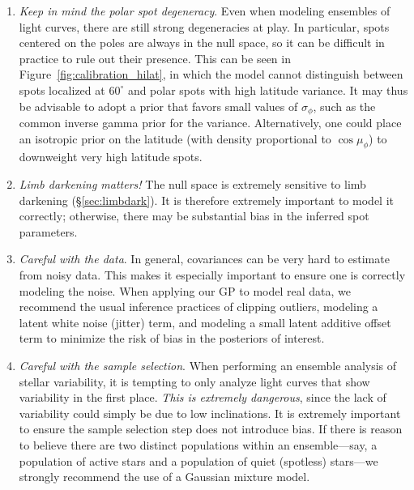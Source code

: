 \documentclass[modern]{aastex62}
\begin{document}
\begin{enumerate}
    \item \emph{Keep in mind the polar spot degeneracy}. Even when modeling
          ensembles of light curves, there are still strong degeneracies at
          play. In particular, spots centered on the poles are always in
          the null space, so it can be difficult in practice to rule out
          their presence. This can be seen in Figure~\ref{fig:calibration_hilat},
          in which the model cannot distinguish between spots localized
          at $60^\circ$ and polar spots with high latitude variance.
          It may thus be advisable to adopt a prior that favors small values
          of $\sigma_\phi$, such as the common inverse gamma prior for the
          variance. Alternatively, one could place an isotropic prior on
          the latitude (with density proportional to $\cos\mu_\phi$)
          to downweight very high latitude spots.
    \item \emph{Limb darkening matters!} The null space is extremely sensitive
          to limb darkening (\S\ref{sec:limbdark}). It is therefore
          extremely important to model it correctly; otherwise, there may
          be substantial bias in the inferred spot parameters.
    \item \emph{Careful with the data}. In general, covariances can be very
          hard to estimate from noisy data. This makes it especially important
          to ensure one is correctly modeling the noise. When applying our GP
          to model real data, we recommend the usual
          inference practices of clipping outliers,
          modeling a latent white noise (jitter) term, and modeling
          a small latent additive offset term to minimize the risk of
          bias in the posteriors of interest.
    \item \emph{Careful with the sample selection}. When performing an ensemble
          analysis of stellar variability, it is tempting to only analyze light curves
          that show variability in the first place. \emph{This is extremely
              dangerous}, since the lack of variability could simply be due to low
          inclinations. It is extremely important to ensure the sample selection step does
          not introduce bias. If there is reason to believe there are two
          distinct populations within an ensemble---say, a population of active
          stars and a population of quiet (spotless) stars---we strongly recommend
          the use of a Gaussian mixture model.
\end{enumerate}
\end{document}
